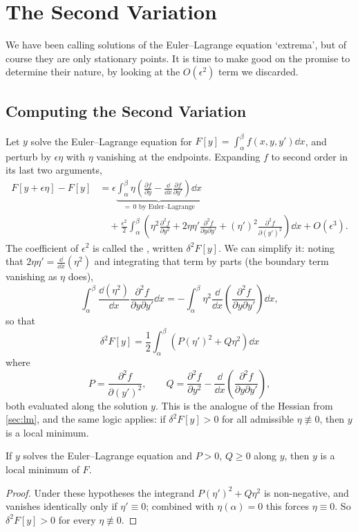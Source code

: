 \documentclass[a4paper]{scrartcl}
\begin{document}
\section{The Second Variation}\label{sec:secondvar}

We have been calling solutions of the Euler--Lagrange equation `extrema', but of course they are only stationary points. It is time to make good on the promise to determine their nature, by looking at the $O(\epsilon^2)$ term we discarded.

\subsection{Computing the Second Variation}

Let $y$ solve the Euler--Lagrange equation for $F[y] = \int_\alpha^\beta f(x,y,y')\dd x$, and perturb by $\epsilon\eta$ with $\eta$ vanishing at the endpoints. Expanding $f$ to second order in its last two arguments,
\begin{align*}
	F[y + \epsilon\eta] - F[y] &= \epsilon \underbrace{\int_\alpha^\beta \eta\left(\frac{\partial f}{\partial y} - \frac{\dd}{\dd x}\frac{\partial f}{\partial y'}\right)\dd x}_{= \,0 \text{ by Euler--Lagrange}} \\
	&\quad + \frac{\epsilon^2}{2}\int_\alpha^\beta\left(\eta^2 \frac{\partial^2 f}{\partial y^2} + 2\eta\eta'\frac{\partial^2 f}{\partial y \partial y'} + (\eta')^2\frac{\partial^2 f}{\partial (y')^2}\right)\dd x + O(\epsilon^3).
\end{align*}
The coefficient of $\epsilon^2$ is called the , written $\delta^2 F[y]$. We can simplify it: noting that $2\eta\eta' = \frac{\dd}{\dd x}(\eta^2)$ and integrating that term by parts (the boundary term vanishing as $\eta$ does),
$$
\int_\alpha^\beta \frac{\dd (\eta^2)}{\dd x}\frac{\partial^2 f}{\partial y\partial y'}\dd x = -\int_\alpha^\beta \eta^2 \frac{\dd}{\dd x}\left(\frac{\partial^2 f}{\partial y \partial y'}\right)\dd x,
$$
so that
$$
\boxed{\ \delta^2 F[y] = \frac{1}{2}\int_\alpha^\beta\left(P(\eta')^2 + Q\eta^2\right)\dd x\ }
$$
where
$$
P = \frac{\partial^2 f}{\partial (y')^2}, \qquad Q = \frac{\partial^2 f}{\partial y^2} - \frac{\dd}{\dd x}\left(\frac{\partial^2 f}{\partial y \partial y'}\right),
$$
both evaluated along the solution $y$. This is the analogue of the Hessian from \autoref{sec:lm}, and the same logic applies: if $\delta^2 F[y] > 0$ for all admissible $\eta \not\equiv 0$, then $y$ is a local minimum.

\begin{proposition}
	If $y$ solves the Euler--Lagrange equation and $P > 0$, $Q \geq 0$ along $y$, then $y$ is a local minimum of $F$.
\end{proposition}
\begin{proof}
	Under these hypotheses the integrand $P(\eta')^2 + Q\eta^2$ is non-negative, and vanishes identically only if $\eta' \equiv 0$; combined with $\eta(\alpha) = 0$ this forces $\eta \equiv 0$. So $\delta^2 F[y] > 0$ for every $\eta\not\equiv 0$.
\end{proof}
\end{document}
